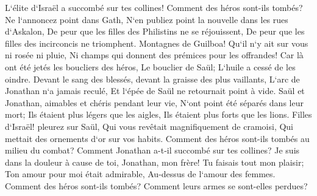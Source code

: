 \verse L`élite d`Israël a succombé sur tes collines! Comment des héros sont-ils tombés? 
\verse Ne l`annoncez point dans Gath, N`en publiez point la nouvelle dans les rues d`Askalon, De peur que les filles des Philistins ne se réjouissent, De peur que les filles des incirconcis ne triomphent. 
\verse Montagnes de Guilboa! Qu`il n`y ait sur vous ni rosée ni pluie, Ni champs qui donnent des prémices pour les offrandes! Car là ont été jetés les boucliers des héros, Le bouclier de Saül; L`huile a cessé de les oindre. 
\verse Devant le sang des blessés, devant la graisse des plus vaillants, L`arc de Jonathan n`a jamais reculé, Et l`épée de Saül ne retournait point à vide. 
\verse Saül et Jonathan, aimables et chéris pendant leur vie, N`ont point été séparés dans leur mort; Ils étaient plus légers que les aigles, Ils étaient plus forts que les lions. 
\verse Filles d`Israël! pleurez sur Saül, Qui vous revêtait magnifiquement de cramoisi, Qui mettait des ornements d`or sur vos habits. 
\verse Comment des héros sont-ils tombés au milieu du combat? Comment Jonathan a-t-il succombé sur tes collines? 
\verse Je suis dans la douleur à cause de toi, Jonathan, mon frère! Tu faisais tout mon plaisir; Ton amour pour moi était admirable, Au-dessus de l`amour des femmes. 
\verse Comment des héros sont-ils tombés? Comment leurs armes se sont-elles perdues? 

